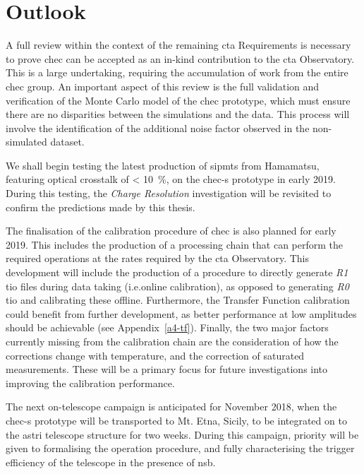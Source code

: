 \section{Outlook}
 
A full review within the context of the remaining \gls{cta} Requirements is necessary to prove \gls{chec} can be accepted as an in-kind contribution to the \gls{cta} Observatory. This is a large undertaking, requiring the accumulation of work from the entire \gls{chec} group. An important aspect of this review is the full validation and verification of the Monte Carlo model of the \gls{chec} prototype, which must ensure there are no disparities between the simulations and the data. This process will involve the identification of the additional noise factor observed in the non-simulated dataset.

We shall begin testing the latest production of \glspl{sipmt} from Hamamatsu, featuring optical crosstalk of \SI{< 10}{\percent}, on the \gls{chec-s} prototype in early 2019. During this testing, the \textit{Charge Resolution} investigation will be revisited to confirm the predictions made by this thesis.

The finalisation of the calibration procedure of \gls{chec} is also planned for early 2019. This includes the production of a processing chain that can perform the required operations at the rates required by the \gls{cta} Observatory. This development will include the production of a procedure to directly generate \textit{R1} \gls{tio} files during data taking (i.e.\@ online calibration), as opposed to generating \textit{R0} \gls{tio} and calibrating these offline. Furthermore, the Transfer Function calibration could benefit from further development, as better performance at low amplitudes should be achievable (see Appendix~\ref{a4-tf}). Finally, the two major factors currently missing from the calibration chain are the consideration of how the corrections change with temperature, and the correction of saturated measurements. These will be a primary focus for future investigations into improving the calibration performance.

The next on-telescope campaign is anticipated for November 2018, when the \gls{chec-s} prototype will be transported to Mt. Etna, Sicily, to be integrated on to the \gls{astri} telescope structure for two weeks. During this campaign, priority will be given to formalising the operation procedure, and fully characterising the trigger efficiency of the telescope in the presence of \gls{nsb}.